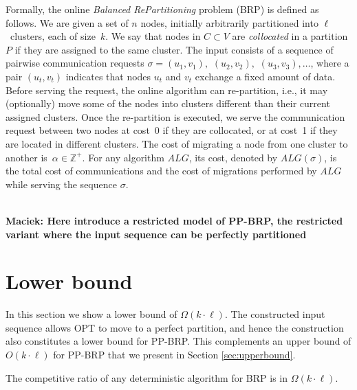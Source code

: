 \documentclass[manuscript,screen=true]{acmart}
\newcommand{\OBRP}{BRP}
\newcommand{\PPOBRP}{PP-BRP}
\newcommand\maciek[1]{\color{brown}\textbf{\\ Maciek: #1}\color{black}}
\begin{document}
Formally, the online \emph{Balanced RePartitioning} problem (\OBRP{}) is defined as
follows. We are given a set of $n$ nodes,
initially arbitrarily partitioned into $\ell$~clusters,
each of size~$k$.
We say that nodes in $C \subset V$ are \emph{collocated} in a partition $P$
if they are assigned to the same cluster.
The input consists of a sequence of pairwise communication requests
$\sigma = (u_1,v_1),$ $(u_2,v_2),$ $(u_3,v_3), \ldots$,
where a pair $(u_t,v_t)$ indicates that nodes $u_t$ and $v_t$ exchange a fixed amount of data.
Before serving the request,
the online algorithm
can re-partition,
i.e.,
it may (optionally) move some of the nodes into clusters different than their current assigned clusters.
Once the re-partition is executed,
we serve
the communication request between two  nodes at cost~0 if they are collocated,
or at cost~1 if they are located in different clusters.
The cost of migrating a node from one cluster to another
is~$\alpha \in \mathbb{Z}^+$.
For any algorithm $ALG$,
its cost,
denoted by $ALG(\sigma)$,
is the total cost of communications and
the cost of migrations performed by $ALG$ while serving the sequence $\sigma$.

\maciek{Here introduce a restricted model of \PPOBRP{}, the restricted variant where the input sequence can be perfectly partitioned}

\section{Lower bound} %

In this section we show a lower bound of $\Omega(k \cdot \ell)$.
The constructed input sequence allows OPT to move to a perfect partition, and hence
the construction also constitutes a lower bound for \PPOBRP{}.
This complements an upper bound of $O(k \cdot \ell)$
for \PPOBRP{} that we present in Section \ref{sec:upperbound}.

\begin{theorem}
  The competitive ratio of any deterministic algorithm for \OBRP{} is in $\Omega(k\cdot \ell)$.
\end{theorem}
\end{document}
